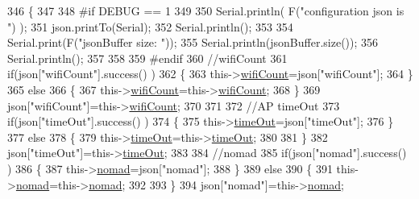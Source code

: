 \begin{DoxyCode}
346         \{
347         
348 \textcolor{preprocessor}{        #if DEBUG == 1 }
349         
350             Serial.println( F(\textcolor{stringliteral}{"configuration json is "}) );
351             json.printTo(Serial);
352             Serial.println();
353 
354             Serial.print(F(\textcolor{stringliteral}{"jsonBuffer size: "}));
355             Serial.println(jsonBuffer.size());
356             Serial.println();
357 
358 
359 \textcolor{preprocessor}{        #endif}
360             \textcolor{comment}{//wifiCount}
361             \textcolor{keywordflow}{if}(json[\textcolor{stringliteral}{"wifiCount"}].success() )
362             \{           
363                 this->\hyperlink{classCoolWifi_ab133bd92fcb895b884deecd6678592e4}{wifiCount}=json[\textcolor{stringliteral}{"wifiCount"}];
364             \}
365             \textcolor{keywordflow}{else}
366             \{
367                 this->\hyperlink{classCoolWifi_ab133bd92fcb895b884deecd6678592e4}{wifiCount}=this->\hyperlink{classCoolWifi_ab133bd92fcb895b884deecd6678592e4}{wifiCount};
368             \}
369             json[\textcolor{stringliteral}{"wifiCount"}]=this->\hyperlink{classCoolWifi_ab133bd92fcb895b884deecd6678592e4}{wifiCount};
370 
371             
372             \textcolor{comment}{//AP timeOut}
373             \textcolor{keywordflow}{if}(json[\textcolor{stringliteral}{"timeOut"}].success() )
374             \{
375                 this->\hyperlink{classCoolWifi_a952111605f25156588b5632caaba1c6f}{timeOut}=json[\textcolor{stringliteral}{"timeOut"}];
376             \}
377             \textcolor{keywordflow}{else}
378             \{
379                 this->\hyperlink{classCoolWifi_a952111605f25156588b5632caaba1c6f}{timeOut}=this->\hyperlink{classCoolWifi_a952111605f25156588b5632caaba1c6f}{timeOut};
380 
381             \}
382             json[\textcolor{stringliteral}{"timeOut"}]=this->\hyperlink{classCoolWifi_a952111605f25156588b5632caaba1c6f}{timeOut};
383 
384             \textcolor{comment}{//nomad}
385             \textcolor{keywordflow}{if}(json[\textcolor{stringliteral}{"nomad"}].success() )
386             \{
387                 this->\hyperlink{classCoolWifi_ab7d9643c4af7bac3be331ef008b2ea27}{nomad}=json[\textcolor{stringliteral}{"nomad"}];
388             \}
389             \textcolor{keywordflow}{else}
390             \{
391                 this->\hyperlink{classCoolWifi_ab7d9643c4af7bac3be331ef008b2ea27}{nomad}=this->\hyperlink{classCoolWifi_ab7d9643c4af7bac3be331ef008b2ea27}{nomad};
392 
393             \}
394             json[\textcolor{stringliteral}{"nomad"}]=this->\hyperlink{classCoolWifi_ab7d9643c4af7bac3be331ef008b2ea27}{nomad};

\end{DoxyCode}
